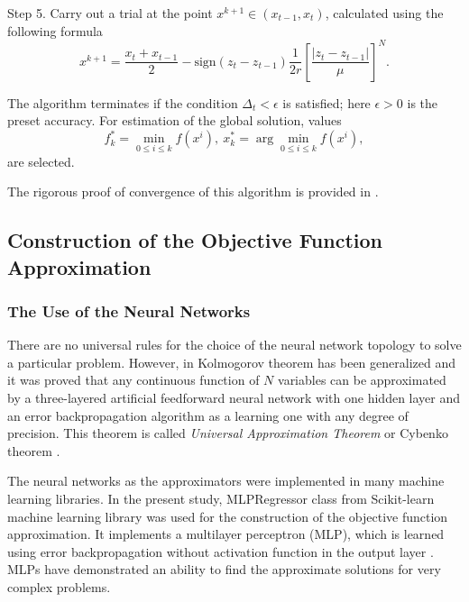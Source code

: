 \documentclass[sensors,article,submit,moreauthors,pdftex]{Definitions/mdpi}
\begin{document}
Step 5. Carry out a trial at the point $x^{k+1}\in(x_{t-1},x_t)$, calculated using the following formula
\begin{equation}\label{NewX}
x^{k+1} = \frac{x_t+x_{t-1}}{2} - \mathrm{sign}(z_t-z_{t-1})\frac{1}{2r}\left[\frac{\left|z_t-z_{t-1}\right|}{\mu}\right]^N.
\end{equation}

The algorithm terminates if the condition $\Delta_t<\epsilon$ is satisfied; here $\epsilon>0$ is the preset accuracy. For estimation of the global solution, values
\[
f_k^\ast=\min_{0\leq i \leq k}f(x^i), \ x_k^\ast=\arg \min_{0\leq i \leq k}f(x^i),
\]
are selected.

The rigorous proof of convergence of this algorithm is provided in \cite{Strongin2000}. 



\subsection{Construction of the Objective Function Approximation}

\subsubsection{The Use of the Neural Networks}

There are no universal rules for the choice of the neural network topology to solve a particular problem. However, in \cite{Cybenko1989} Kolmogorov theorem has been generalized and it was proved that any continuous function of $N$ variables can be approximated by a three-layered artificial feedforward neural network with one hidden layer and an error backpropagation algorithm as a learning one with any degree of precision. This theorem is called \textit{Universal Approximation Theorem} or Cybenko theorem \cite{Hassoun1995}.

The neural networks as the approximators were implemented in many machine learning libraries.
In the present study, MLPRegressor class from Scikit-learn machine learning library was used for the construction of the objective function approximation. It implements a multilayer perceptron (MLP), which is learned using error backpropagation without activation function in the output layer \cite{Nielsen1989}. MLPs have demonstrated an ability to find the approximate solutions for very complex problems.
\end{document}
